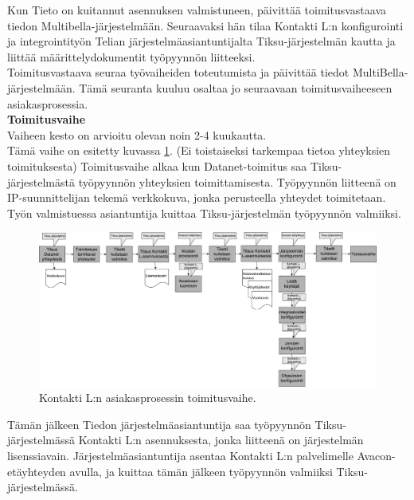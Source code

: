 \documentclass[finnish,12pt,a4paper,pdftex]{article}
\begin{document}
Kun Tieto on kuitannut asennuksen valmistuneen, päivittää toimitusvastaava tiedon Multibella-järjestelmään. Seuraavaksi hän tilaa Kontakti L:n konfigurointi ja integrointityön Telian järjestelmäasiantuntijalta Tiksu-järjestelmän kautta ja liittää määrittelydokumentit työpyynnön liitteeksi.\\

Toimitusvastaava seuraa työvaiheiden toteutumista ja päivittää tiedot MultiBella-järjestelmään. Tämä seuranta kuuluu osaltaa jo seuraavaan toimitusvaiheeseen asiakasprosessia.\\

\textbf{Toimitusvaihe}\\

Vaiheen kesto on arvioitu olevan noin 2-4 kuukautta.\\

Tämä vaihe on esitetty kuvassa \ref{fig:toimitus}. (Ei toistaiseksi tarkempaa tietoa yhteyksien toimituksesta) Toimitusvaihe alkaa kun Datanet-toimitus saa Tiksu-järjestelmästä työpyynnön yhteyksien toimittamisesta. Työpyynnön liitteenä on IP-suunnittelijan tekemä verkkokuva, jonka perusteella yhteydet toimitetaan. Työn valmistuessa asiantuntija kuittaa Tiksu-järjestelmän työpyynnön valmiiksi.\\

\begin{figure}[!h]
    \centering
    \includegraphics[scale=0.3]{images/toimitus.pdf}
    \caption{Kontakti L:n asiakasprosessin toimitusvaihe.}
    \label{fig:toimitus}
\end{figure}

Tämän jälkeen Tiedon järjestelmäasiantuntija saa työpyynnön Tiksu-järjestelmässä Kontakti L:n asennuksesta, jonka liitteenä on järjestelmän lisenssiavain. Järjestelmäasiantuntija asentaa Kontakti L:n palvelimelle Avacon-etäyhteyden avulla, ja kuittaa tämän jälkeen työpyynnön valmiiksi Tiksu-järjestelmässä.\\
\end{document}
